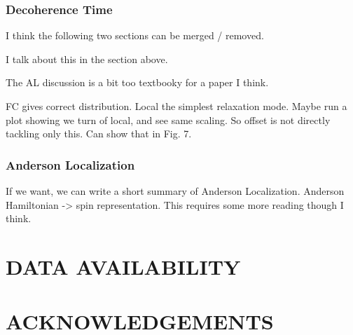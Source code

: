 \documentclass[prd,twocolumn,tightenlines,preprintnumbers,showpacs,superscriptaddress,notitlepage,nofootinbib,eqsecnum,floatfix,longbibliography,aps,10pt]{revtex4-2}
\begin{document}
{\color{red}
\subsubsection{Decoherence Time}
\label{sec:methods:deco}

I think the following two sections can be merged / removed.

I talk about this in the section above.

The AL discussion is a bit too textbooky for a paper I think.


FC gives correct distribution. Local the simplest relaxation mode. Maybe run a plot showing we turn of local, and see same scaling. So offset is not directly tackling only this. Can show that in Fig. 7.

\subsubsection{Anderson Localization}
\label{sec:methods:mbl}
{\color{green} If we want, we can write a short summary of Anderson Localization. Anderson Hamiltonian -> spin representation. This requires some more reading though I think.}

}
\section{DATA AVAILABILITY}
\label{sec:open-source}


\section{ACKNOWLEDGEMENTS}
\end{document}
